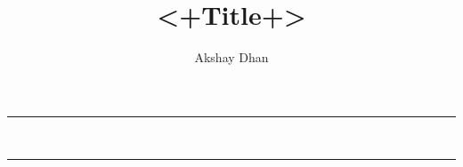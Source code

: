 \documentclass[a4paper,12pt]{article}
\title{\textbf{<+Title+>}}
\author{Akshay Dhan}
\theoremstyle{remark}
\theoremstyle{definition}
\begin{document}
\hrule
\begin{flushright}
\normalsize \@author \\
\@date
\end{flushright}
\hrule
	
\end{document}
